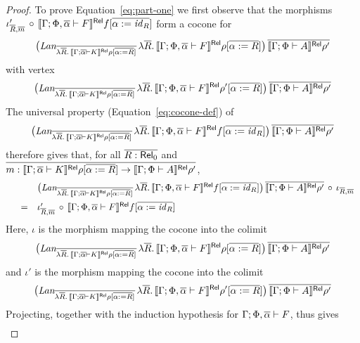 \documentclass{lmcs}
\theoremstyle{plain}\newtheorem{satz}[thm]{Satz}
\renewcommand{\id}{\mathit{id}}
\begin{document}
{\begin{proof}
\vspace*{0.1in}

To prove Equation~\ref{eq:part-one} we first observe that the
morphisms $\iota'_{\ol{R}, \ol{m}} \,\circ\, \relsem{\Gamma; \Phi,
  \ol\alpha \vdash F}f[\ol{\alpha := \id_R}]$ form a cocone for
\[
\big(\textit{Lan}_{\ol{\lambda \ol{R}.\,\relsem{\Gamma; \ol\alpha
      \vdash K}\rho[\ol{\alpha := R}]}}\, \lambda
\ol{R}.\,\relsem{\Gamma; \Phi, \ol\alpha \vdash F}\rho[\ol{\alpha :=
    R}]\big)\, \ol{\relsem{\Gamma; \Phi \vdash A}\rho'}
\]
with vertex 
\[
\big(\textit{Lan}_{\ol{\lambda \ol{R}.\,\relsem{\Gamma; \ol\alpha
      \vdash K}\rho[\ol{\alpha := R}]}}\, \lambda
\ol{R}.\,\relsem{\Gamma; \Phi, \ol\alpha \vdash F}\rho'[\ol{\alpha :=
    R}]\big)\, \ol{\relsem{\Gamma; \Phi \vdash A}\rho'}
\]
The universal property (Equation~\ref{eq:cocone-def}) of
\[
\big(\textit{Lan}_{\ol{\lambda \ol{R}.\,\relsem{\Gamma; \ol\alpha
      \vdash K}\rho[\ol{\alpha := R}]}}\, \lambda
\ol{R}.\,\relsem{\Gamma; \Phi, \ol\alpha \vdash F}f[\ol{\alpha :=
    \id_R}]\big)\, \ol{\relsem{\Gamma; \Phi \vdash A}\rho'}
\]
therefore gives that, for all $\overline{R : \mathsf{Rel}_0}$ and $\overline{m :
  \llbracket{\Gamma; \overline{\alpha} \vdash K}\rrbracket^{\mathsf{Rel}}\rho[\overline{\alpha := R}] \to
  \llbracket{\Gamma; \Phi \vdash A}\rrbracket^{\mathsf{Rel}}\rho'}$,
\[\begin{array}{lll}
& & \big(\textit{Lan}_{\ol{\lambda \ol{R}.\,\relsem{\Gamma; \ol\alpha
      \vdash K}\rho[\ol{\alpha := R}]}}\, \lambda
\ol{R}.\,\relsem{\Gamma; \Phi, \ol\alpha \vdash F}f[\ol{\alpha :=
    \id_R}]\big)\, \ol{\relsem{\Gamma; \Phi \vdash A}\rho'} \,\circ\,
\iota_{\ol{R}, \ol{m}}\\[2ex]
& = & \iota'_{\ol{R}, \ol{m}} \,\circ\, \relsem{\Gamma; \Phi,
  \ol\alpha \vdash F}f[\ol{\alpha := \id_R}]
\end{array}\]
Here, $\iota$ is the morphism mapping the cocone into the colimit
\[
\big(\textit{Lan}_{\ol{\lambda \ol{R}.\,\relsem{\Gamma; \ol\alpha
      \vdash K}\rho[\ol{\alpha := R}]}}\, \lambda
\ol{R}.\,\relsem{\Gamma; \Phi, \ol\alpha \vdash F}\rho[\ol{\alpha :=
    R}]\big)\, \ol{\relsem{\Gamma; \Phi \vdash A}\rho'}
\]
and $\iota'$ is the morphism mapping the cocone into the colimit
\[
\big(\textit{Lan}_{\ol{\lambda \ol{R}.\,\relsem{\Gamma; \ol\alpha
      \vdash K}\rho[\ol{\alpha := R}]}}\, \lambda
\ol{R}.\,\relsem{\Gamma; \Phi, \ol\alpha \vdash F}\rho'[\ol{\alpha :=
    R}]\big)\, \ol{\relsem{\Gamma; \Phi \vdash A}\rho'}
\]
Projecting, together with the induction hypothesis for $\Gamma; \Phi,
\overline{\alpha}\vdash F$, thus gives
\[\begin{array}{lll}

\end{array}\]
\end{proof}}
\end{document}
